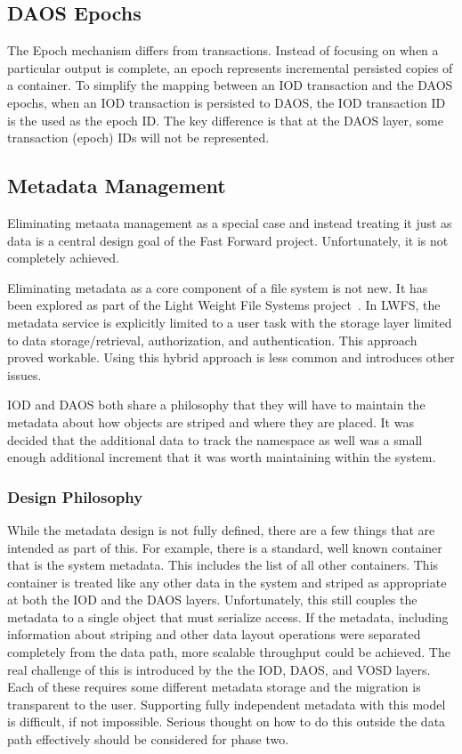 \documentclass[conference]{sig-alt-gov2}
\begin{document}
\subsection{DAOS Epochs}
The Epoch mechanism differs from transactions. Instead of focusing on when a
particular output is complete, an epoch represents incremental persisted copies
of a container. To simplify the mapping between an IOD transaction and the DAOS
epochs, when an IOD transaction is persisted to DAOS, the IOD transaction ID is
the used as the epoch ID. The key difference is that at the DAOS layer, some
transaction (epoch) IDs will not be represented.

\subsection{Metadata Management}
Eliminating metaata management as a special case and instead treating it just
as data is a central design goal of the Fast Forward project. Unfortunately,
it is not completely achieved.

Eliminating metadata as a core component of a file system is not new. It has
been explored as part of the Light Weight File Systems
project~\cite{oldfield:lwfs}. In LWFS, the metadata service is explicitly
limited to a user task with the storage layer limited to data
storage/retrieval, authorization, and authentication. This approach proved
workable. Using this hybrid approach is less common and introduces other
issues.

IOD and DAOS both share a philosophy that they will have to maintain the
metadata about how objects are striped and where they are placed. It was
decided that the additional data to track the namespace as well was a small
enough additional increment that it was worth maintaining within the system.

\subsubsection{Design Philosophy}
While the metadata design is not fully defined, there are a few things that
are intended as part of this. For example, there is a standard, well known
container that is the system metadata. This includes the list of all other
containers. This container is treated like any other data in the system and
striped as appropriate at both the IOD and the DAOS layers. Unfortunately, this
still couples the metadata to a single object that must serialize access. If
the metadata, including information about striping and other data layout
operations were separated completely from the data path, more scalable
throughput could be achieved. The real challenge of this is introduced by the
the IOD, DAOS, and VOSD layers. Each of these requires some different metadata
storage and the migration is transparent to the user. Supporting fully
independent metadata with this model is difficult, if not impossible. Serious
thought on how to do this outside the data path effectively should be
considered for phase two.
\end{document}
